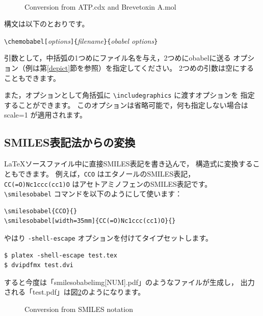 \documentclass[12pt]{ltjsarticle}
\begin{document}
\begin{figure}[h]
  \centering
   \\ \vspace{1cm}
  \caption{Conversion from ATP.cdx and Brevetoxin A.mol}\label{fig:chem1}
\end{figure}

構文は以下のとおりです。
\begin{center}
\verb|\chemobabel[|\textit{options}\verb|]{|\textit{filename}\verb|}{|\textit{obabel options}\verb|}|
\end{center}
引数として，中括弧の1つめにファイル名を与え，2つめにobabelに送る
オプション（例は第\ref{depict}節を参照）を指定してください。
2つめの引数は空にすることもできます。

また，オプションとして角括弧に \verb|\includegraphics| に渡すオプションを
指定することができます。
このオプションは省略可能で，何も指定しない場合は scale=1 が適用されます。

\subsection{SMILES表記法からの変換}

\LaTeX ソースファイル中に直接SMILES表記を書き込んで，
構造式に変換することもできます。
例えば，\verb|CCO| はエタノールのSMILES表記，
\verb|CC(=O)Nc1ccc(cc1)O| はアセトアミノフェンのSMILES表記です。
\verb|\smilesobabel| コマンドを以下のようにして使います：

\begin{verbatim}
\smilesobabel{CCO}{}
\smilesobabel[width=35mm]{CC(=O)Nc1ccc(cc1)O}{}
\end{verbatim}

やはり \verb|-shell-escape| オプションを付けてタイプセットします。
\begin{verbatim}
$ platex -shell-escape test.tex
$ dvipdfmx test.dvi
\end{verbatim}
すると今度は「smilesobabelimg[NUM].pdf」のようなファイルが生成し，
出力される「test.pdf」は図\ref{fig:smi1}のようになります。
\begin{figure}[h]
  \centering
   \quad
  \caption{Conversion from SMILES notation}\label{fig:smi1}
\end{figure}
\end{document}
